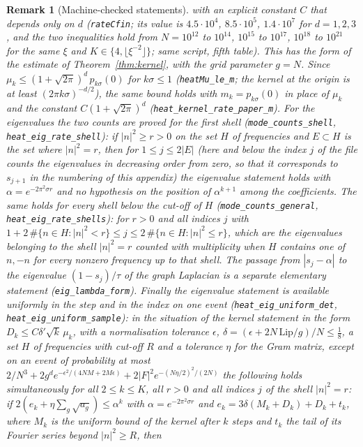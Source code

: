 \documentclass[11pt,a4paper]{article}
\theoremstyle{stmt}
\theoremstyle{defn}
\theoremstyle{rmk}
\newtheorem{remark}[theorem]{Remark}
\numberwithin{equation}{section}
\begin{document}
{\begin{remark}[Machine-checked statements]
with an explicit constant $C$ that depends only on $d$ (\texttt{rateCfin}; its value is $4.5\cdot10^{4}$, $8.5\cdot10^{5}$, $1.4\cdot10^{7}$ for $d=1,2,3$, and the two inequalities hold from $N=10^{12}$ to $10^{14}$, $10^{15}$ to $10^{17}$, $10^{18}$ to $10^{21}$ for the same $\xi$ and $K\in\{4,\lfloor\xi^{-2}\rfloor\}$; same script, fifth table). This has the form of the estimate of Theorem~\ref{thm:kernel}, with the grid parameter $g=N$. Since $\mu_k\le(1+\sqrt{2\pi})^d\,p_{k\sigma}(0)$ for $k\sigma\le1$ (\texttt{heatMu\_le\_m}; the kernel at the origin is at least $(2\pi k\sigma)^{-d/2}$), the same bound holds with $m_k=p_{k\sigma}(0)$ in place of $\mu_k$ and the constant $C(1+\sqrt{2\pi})^d$ (\texttt{heat\_kernel\_rate\_paper\_m}). For the eigenvalues the two counts are proved for the first shell (\texttt{mode\_counts\_shell}, \texttt{heat\_eig\_rate\_shell}): if $|n|^2\ge r>0$ on the set $H$ of frequencies and $E\subset H$ is the set where $|n|^2=r$, then for $1\le j\le2|E|$ (here and below the index $j$ of the file counts the eigenvalues in decreasing order from zero, so that it corresponds to $s_{j+1}$ in the numbering of this appendix) the eigenvalue statement holds with $\alpha=e^{-2\pi^2\sigma r}$ and no hypothesis on the position of $\alpha^{k+1}$ among the coefficients. The same holds for every shell below the cut-off of $H$ (\texttt{mode\_counts\_general}, \texttt{heat\_eig\_rate\_shells}): for $r>0$ and all indices $j$ with $1+2\,\#\{n\in H:|n|^2<r\}\le j\le2\,\#\{n\in H:|n|^2\le r\}$, which are the eigenvalues belonging to the shell $|n|^2=r$ counted with multiplicity when $H$ contains one of $n,-n$ for every nonzero frequency up to that shell. The passage from $|s_j-\alpha|$ to the eigenvalue $(1-s_j)/\tau$ of the graph Laplacian is a separate elementary statement (\texttt{eig\_lambda\_form}). Finally the eigenvalue statement is available uniformly in the step and in the index on one event (\texttt{heat\_eig\_uniform\_det}, \texttt{heat\_eig\_uniform\_sample}): in the situation of the kernel statement in the form $D_k\le C\delta'\sqrt k\,\mu_k$, with a normalisation tolerance $\epsilon$, $\delta=(\epsilon+2N\,\mathrm{Lip}/g)/N\le\frac18$, a set $H$ of frequencies with cut-off $R$ and a tolerance $\eta$ for the Gram matrix, except on an event of probability at most $2/N^3+2g^de^{-\epsilon^2/(4NM+2M\epsilon)}+2|F|^2e^{-(N\eta/2)^2/(2N)}$ the following holds simultaneously for all $2\le k\le K$, all $r>0$ and all indices $j$ of the shell $|n|^2=r$: if $2(e_k+\eta\sum_g\sqrt{a_g})\le\alpha^k$ with $\alpha=e^{-2\pi^2\sigma r}$ and $e_k=3\delta(M_k+D_k)+D_k+t_k$, where $M_k$ is the uniform bound of the kernel after $k$ steps and $t_k$ the tail of its Fourier series beyond $|n|^2\ge R$, then

\end{remark}}
\end{document}

